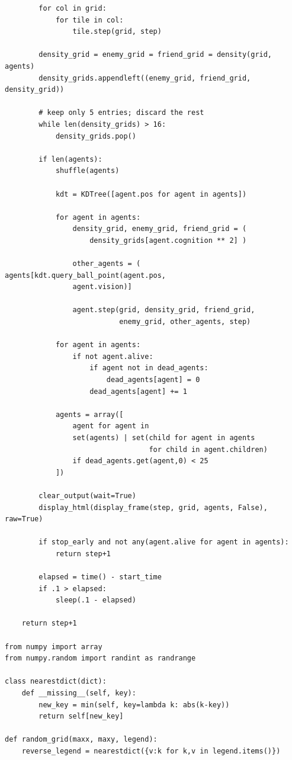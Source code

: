 \begin{verbatim}
        for col in grid:
            for tile in col:
                tile.step(grid, step)
    
        density_grid = enemy_grid = friend_grid = density(grid, agents)
        density_grids.appendleft((enemy_grid, friend_grid, density_grid))        
        
        # keep only 5 entries; discard the rest
        while len(density_grids) > 16:
            density_grids.pop()
        
        if len(agents):
            shuffle(agents)
                
            kdt = KDTree([agent.pos for agent in agents])

            for agent in agents:
                density_grid, enemy_grid, friend_grid = ( 
                    density_grids[agent.cognition ** 2] )

                other_agents = ( agents[kdt.query_ball_point(agent.pos, 
                agent.vision)]
                
                agent.step(grid, density_grid, friend_grid, 
                           enemy_grid, other_agents, step)

            for agent in agents:
                if not agent.alive:
                    if agent not in dead_agents:
                        dead_agents[agent] = 0
                    dead_agents[agent] += 1

            agents = array([
                agent for agent in         
                set(agents) | set(child for agent in agents 
                                  for child in agent.children)
                if dead_agents.get(agent,0) < 25
            ])
        
        clear_output(wait=True)
        display_html(display_frame(step, grid, agents, False), raw=True)
        
        if stop_early and not any(agent.alive for agent in agents):
            return step+1

        elapsed = time() - start_time
        if .1 > elapsed:
            sleep(.1 - elapsed)
    
    return step+1
    
from numpy import array
from numpy.random import randint as randrange

class nearestdict(dict):
    def __missing__(self, key):
        new_key = min(self, key=lambda k: abs(k-key))
        return self[new_key]

def random_grid(maxx, maxy, legend):
    reverse_legend = nearestdict({v:k for k,v in legend.items()})
    

\end{verbatim}
